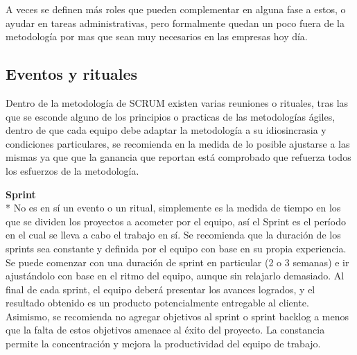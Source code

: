 \documentclass[../pfc.tex]{subfiles}
\begin{document}
	A veces se definen más roles que pueden complementar en alguna fase a estos, o ayudar en tareas administrativas, pero formalmente quedan un poco fuera de la metodología por mas que sean muy necesarios en las empresas hoy día.
	
	\subsection{Eventos y rituales}
	
	Dentro de la metodología de SCRUM existen varias reuniones o rituales, tras las que se esconde alguno de los principios o practicas de las metodologías ágiles\cite{agile}, dentro de que cada equipo debe adaptar la metodología a su idiosincrasia y condiciones particulares, se recomienda en la medida de lo posible ajustarse a las mismas ya que que la ganancia que reportan está comprobado que refuerza todos los esfuerzos de la metodología. 
		
	\textbf{Sprint}\\* 
	No es en sí un evento o un ritual, simplemente es la medida de tiempo en los que se dividen los proyectos a acometer por el equipo, así el Sprint es el período en el cual se lleva a cabo el trabajo en sí. Se recomienda que la duración de los sprints sea constante y definida por el equipo con base en su propia experiencia. Se puede comenzar con una duración de sprint en particular (2 o 3 semanas) e ir ajustándolo con base en el ritmo del equipo, aunque sin relajarlo demasiado. Al final de cada sprint, el equipo deberá presentar los avances logrados, y el resultado obtenido es un producto potencialmente entregable al cliente. Asimismo, se recomienda no agregar objetivos al sprint o sprint backlog a menos que la falta de estos objetivos amenace al éxito del proyecto. La constancia permite la concentración y mejora la productividad del equipo de trabajo.\\
	
\end{document}

